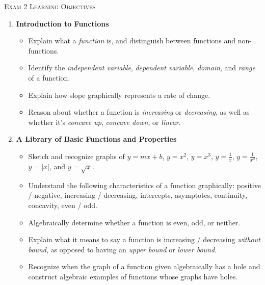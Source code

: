 \documentclass{article}
\begin{document}
\begin{center}
  \Large\textsc{Exam 2 Learning Objectives}
\end{center}

\begin{enumerate}
\item \textbf{Introduction to Functions} %
\begin{itemize}

\item Explain what a \emph{function} is, and distinguish between functions and non-functions.

\item Identify the \emph{independent variable}, \emph{dependent variable}, \emph{domain}, and \emph{range} of a function.

\item Explain how slope graphically represents a rate of change.

\item Reason about whether a function is \emph{increasing} or \emph{decreasing}, as well as whether it's \emph{concave up}, \emph{concave down}, or \emph{linear}.

\end{itemize}

\item \textbf{A Library of Basic Functions and Properties} %
\begin{itemize}
\item Sketch and recognize graphs of $y = mx + b$, $y = x^2$, $y = x^3$, $y = \frac{1}{x}$, $y = \frac{1}{x^2}$, $y = |x|$, and $y = \sqrt{x}$.

\item Understand the following characteristics of a function graphically: positive / negative, increasing / decreasing, intercepts, asymptotes, continuity, concavity, even / odd.

\item Algebraically determine whether a function is even, odd, or neither.

\item Explain what it means to say a function is increasing / decreasing \emph{without bound}, as opposed to having an \emph{upper bound} or \emph{lower bound}.

\item Recognize when the graph of a function given algebraically has a hole and construct algebraic examples of functions whose graphs have holes.

\end{itemize}


\end{enumerate}
\end{document}
